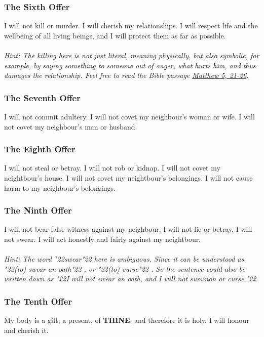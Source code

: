 \documentclass[12pt,a5paper]{article}
\newcommand{\Thine}[0]{\textbf{THINE}}
\newcommand{\q}[1]{\char"22{#1}\char"22 }
\begin{document}
	\subsubsection{The Sixth Offer} \label{TheSixthOffer}
		I will not kill or murder.
		I will cherish my relationships.
		I will respect life and the wellbeing of all living beings,
		and I will protect them as far as possible.
		\\
		\\
		\textit{Hint:
		The killing here is not just literal,
		meaning physically,
		but also symbolic,
		for example,
		by saying something to someone out of anger,
		what hurts him,
		and thus damages the relationship.
		Feel free to read the Bible passage \href{https://www.die-bibel.de/bibeln/online-bibeln/lesen/ESV/MAT.5/Matthew-5}{Matthew 5, 21-26}.}
		
	\subsubsection{The Seventh Offer}
		I will not commit adultery.
		I will not covet my neighbour's woman or wife.
		I will not covet my neighbour's man or husband.
		
	\subsubsection{The Eighth Offer}
		I will not steal or betray.
		I will not rob or kidnap.
		I will not covet my neightbour's house.
		I will not covet my neightbour's belongings.
		I will not cause harm to my neighbour's belongings.
		
	\subsubsection{The Ninth Offer} \label{TheNinthOffer}
		I will not bear false witness against my neighbour.
		I will not lie or betray.
		I will not swear.
		I will act honestly and fairly against my neightbour.
		\\
		\\
		\textit{Hint:
		The word \q{swear} here is ambiguous.
		Since it can be understood as \q{(to) swear an oath},
		or \q{(to) curse}.
		So the sentence could also be written down as
		\q{I will not swear an oath, and I will not summon or curse.}}
		
	\subsubsection{The Tenth Offer} \label{TheTenthOffer}
		My body is a gift, a present, of {\Thine},
		and therefore it is holy.
		I will honour and cherish it.
	
\end{document}
